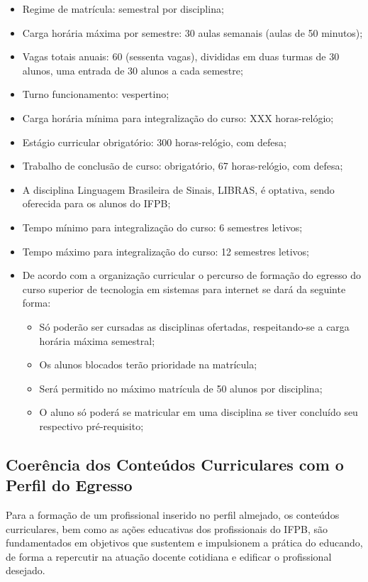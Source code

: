 	\begin{itemize}
		\item Regime de matrícula: semestral por disciplina; 
		\item Carga horária máxima por semestre: 30 aulas semanais (aulas de 50 minutos);
		\item Vagas totais anuais: 60 (sessenta vagas), divididas em duas turmas de 30 alunos, uma entrada de 30 alunos a cada semestre; 
		\item Turno funcionamento: vespertino;
		\item Carga horária mínima para integralização do curso: XXX horas-relógio;
		\item Estágio curricular obrigatório: 300 horas-relógio, com defesa; 
		\item Trabalho de conclusão de curso: obrigatório, 67 horas-relógio, com defesa; 
		\item A disciplina Linguagem Brasileira de Sinais, LIBRAS, é optativa, sendo oferecida para os alunos do IFPB;
		\item Tempo mínimo para integralização do curso: 6 semestres letivos;
		\item Tempo máximo para integralização do curso: 12 semestres letivos;
		\item De acordo com a organização curricular o percurso de formação do egresso do curso superior de tecnologia em sistemas para internet se dará da seguinte forma:
		\begin{itemize}
			\item Só poderão ser cursadas as disciplinas ofertadas, respeitando-se a carga horária máxima semestral;
			\item Os alunos blocados terão prioridade na matrícula;
			\item Será permitido no máximo matrícula de 50 alunos por disciplina;
			\item O aluno só poderá se matricular em uma disciplina se tiver concluído seu respectivo pré-requisito;
		\end{itemize}
	\end{itemize}
	
\subsection{Coerência dos Conteúdos Curriculares com o Perfil do Egresso}

Para a formação de um profissional inserido no perfil almejado, os conteúdos curriculares, bem como as ações educativas dos profissionais do IFPB, são fundamentados em objetivos que sustentem e impulsionem a prática do educando, de forma a repercutir na atuação docente cotidiana e edificar o profissional desejado.


